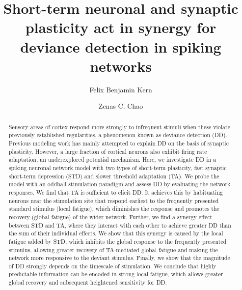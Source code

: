 \documentclass[9pt,lineno,onehalfspacing]{elife}
\title{Short-term neuronal and synaptic plasticity act in synergy for deviance detection in spiking networks}
\author[1]{Felix Benjamin Kern}
\author[1*]{Zenas C. Chao}
\affil[1]{International Research Center for Neurointelligence (WPI-IRCN), The University of Tokyo}
\begin{document}
\maketitle

\begin{abstract}
Sensory areas of cortex respond more strongly to infrequent stimuli when these violate previously established regularities, a phenomenon known as deviance detection (DD). Previous modeling work has mainly attempted to explain DD on the basis of synaptic plasticity. However, a large fraction of cortical neurons also exhibit firing rate adaptation, an underexplored potential mechanism. Here, we investigate DD in a spiking neuronal network model with two types of short-term plasticity, fast synaptic short-term depression (STD) and slower threshold adaptation (TA). We probe the model with an oddball stimulation paradigm and assess DD by evaluating the network responses. We find that TA is sufficient to elicit DD. It achieves this by habituating neurons near the stimulation site that respond earliest to the frequently presented standard stimulus (local fatigue), which diminishes the response and promotes the recovery (global fatigue) of the wider network. Further, we find a synergy effect between STD and TA, where they interact with each other to achieve greater DD than the sum of their individual effects. We show that this synergy is caused by the local fatigue added by STD, which inhibits the global response to the frequently presented stimulus, allowing greater recovery of TA-mediated global fatigue and making the network more responsive to the deviant stimulus. Finally, we show that the magnitude of DD strongly depends on the timescale of stimulation. We conclude that highly predictable information can be encoded in strong local fatigue, which allows greater global recovery and subsequent heightened sensitivity for DD.
\end{abstract}
\end{document}
